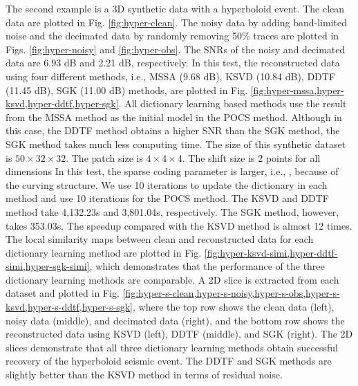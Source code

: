The second example is a 3D synthetic data with a hyperboloid event. The clean data are plotted in Fig. \ref{fig:hyper-clean}. The noisy data by adding band-limited noise and the decimated data by randomly removing 50\% traces are plotted in Figs. \ref{fig:hyper-noisy} and \ref{fig:hyper-obs}. The SNRs of the noisy and decimated data are 6.93 dB and 2.21 dB, respectively. In this test, the reconstructed data using four different methods, i.e., MSSA (9.68 dB), KSVD (10.84 dB), DDTF (11.45 dB), SGK (11.00 dB) methods, are plotted in Fig. \ref{fig:hyper-mssa,hyper-ksvd,hyper-ddtf,hyper-sgk}.  All dictionary learning based methods use the result from the MSSA method as the initial model in the POCS method. Although in this case, the DDTF method obtains a higher SNR than the SGK method, the SGK method takes much less computing time. The size of this synthetic dataset is $50\times 32\times 32$. The patch size is $4\times 4 \times 4$. The shift size is 2 points for all dimensions  In this test, the sparse coding parameter is larger, i.e., , because of the curving structure. We use 10 iterations to update the dictionary in each method and use 10 iterations for the POCS method. The KSVD and DDTF method take 4,132.23s and 3,801.04s, respectively. The SGK method, however, takes 353.03s. The speedup compared with the KSVD method is almost 12 times. The local similarity maps between clean and reconstructed data for each dictionary learning method are plotted in Fig. \ref{fig:hyper-ksvd-simi,hyper-ddtf-simi,hyper-sgk-simi}, which demonstrates that the performance of the three dictionary learning methods are comparable. A 2D slice is extracted from each dataset and plotted in Fig. \ref{fig:hyper-s-clean,hyper-s-noisy,hyper-s-obs,hyper-s-ksvd,hyper-s-ddtf,hyper-s-sgk}, where the top row shows the clean data (left), noisy data (middle), and decimated data (right), and the bottom row shows the reconstructed data using KSVD (left), DDTF (middle), and SGK (right). The 2D slices demonstrate that all three dictionary learning methods obtain successful recovery of the hyperboloid seismic event. The DDTF and SGK methods are slightly better than the KSVD method in terms of residual noise. 

